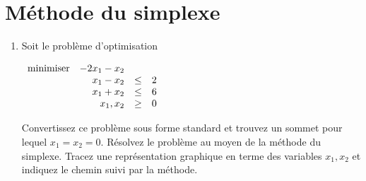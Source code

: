 \section{Méthode du simplexe}

\begin{enumerate}

  \item Soit le problème d'optimisation

    $
    \begin{array}{lrcr}
      \mbox{minimiser} & -2x_1 - x_2 \\
      & x_1 - x_2 & \leq & 2\\
      & x_1 +  x_2 & \leq & 6\\
      & x_1, x_2 & \geq & 0
    \end{array}
    $

    Convertissez ce problème sous forme standard et trouvez un sommet pour
    lequel $x_1 = x_2 =0$.
    Résolvez le problème au moyen de la méthode
    du simplexe.
    Tracez une représentation graphique en terme des variables
    $x_1, x_2$ et indiquez le chemin suivi par la méthode.


\end{enumerate}
